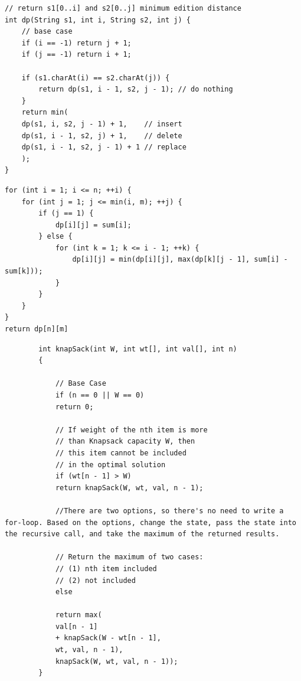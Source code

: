 \documentclass[a4paper,11pt,twoside]{book}
\begin{document}
\begin{itemize}
\begin{lstlisting}
// return s1[0..i] and s2[0..j] minimum edition distance
int dp(String s1, int i, String s2, int j) {
	// base case
	if (i == -1) return j + 1;
	if (j == -1) return i + 1;
	
	if (s1.charAt(i) == s2.charAt(j)) {
		return dp(s1, i - 1, s2, j - 1); // do nothing
	}
	return min(
	dp(s1, i, s2, j - 1) + 1,    // insert
	dp(s1, i - 1, s2, j) + 1,    // delete
	dp(s1, i - 1, s2, j - 1) + 1 // replace
	);
}		
\end{lstlisting}	
	

\begin{lstlisting}	
for (int i = 1; i <= n; ++i) {
	for (int j = 1; j <= min(i, m); ++j) {
		if (j == 1) {
			dp[i][j] = sum[i];
		} else {
			for (int k = 1; k <= i - 1; ++k) {
				dp[i][j] = min(dp[i][j], max(dp[k][j - 1], sum[i] - sum[k]));
			}
		}
	}
}
return dp[n][m]	
\end{lstlisting}	
	

	\begin{lstlisting}
		int knapSack(int W, int wt[], int val[], int n)
		{
			
			// Base Case
			if (n == 0 || W == 0)
			return 0;
			
			// If weight of the nth item is more
			// than Knapsack capacity W, then
			// this item cannot be included
			// in the optimal solution
			if (wt[n - 1] > W)
			return knapSack(W, wt, val, n - 1);
			
			//There are two options, so there's no need to write a for-loop. Based on the options, change the state, pass the state into the recursive call, and take the maximum of the returned results.
			
			// Return the maximum of two cases:
			// (1) nth item included
			// (2) not included
			else
			
			return max(
			val[n - 1]
			+ knapSack(W - wt[n - 1], 
			wt, val, n - 1),
			knapSack(W, wt, val, n - 1));
		}	
	\end{lstlisting}
	
\end{itemize}
\end{document}
